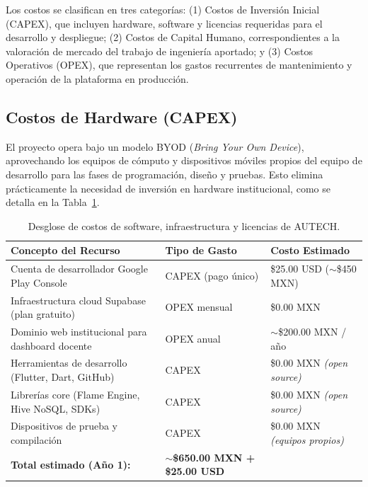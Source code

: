 Los costos se clasifican en tres categorías: (1) Costos de Inversión Inicial (CAPEX), que incluyen hardware, software y licencias requeridas para el desarrollo y despliegue; (2) Costos de Capital Humano, correspondientes a la valoración de mercado del trabajo de ingeniería aportado; y (3) Costos Operativos (OPEX), que representan los gastos recurrentes de mantenimiento y operación de la plataforma en producción.

\subsection{Costos de Hardware (CAPEX)}
\label{subsec:costos_hardware}

El proyecto opera bajo un modelo BYOD (\textit{Bring Your Own Device}), aprovechando los equipos de cómputo y dispositivos móviles propios del equipo de desarrollo para las fases de programación, diseño y pruebas. Esto elimina prácticamente la necesidad de inversión en hardware institucional, como se detalla en la Tabla~\ref{tab:costos_despliegue}.

\begin{table}[htbp]
\centering
\caption{Desglose de costos de software, infraestructura y licencias de AUTECH.}
\label{tab:costos_despliegue}
\setlength{\tabcolsep}{4pt}
\renewcommand{\arraystretch}{1.2}
\scriptsize
\begin{tabularx}{\textwidth}{@{} >{\raggedright\arraybackslash}X >{\raggedright\arraybackslash}p{3cm} >{\raggedleft\arraybackslash}p{4.2cm} @{}}
\toprule
\textbf{Concepto del Recurso} &
\textbf{Tipo de Gasto} &
\textbf{Costo Estimado} \\
\midrule

Cuenta de desarrollador Google Play Console
  & CAPEX (pago único)  & \$25.00 USD (${\sim}$\$450 MXN) \\

Infraestructura cloud Supabase (plan gratuito)
  & OPEX mensual        & \$0.00 MXN \\

Dominio web institucional para dashboard docente
  & OPEX anual          & ${\sim}$\$200.00 MXN / año \\

Herramientas de desarrollo (Flutter, Dart, GitHub)
  & CAPEX                & \$0.00 MXN \textit{(open source)} \\

Librerías core (Flame Engine, Hive NoSQL, SDKs)
  & CAPEX                & \$0.00 MXN \textit{(open source)} \\

Dispositivos de prueba y compilación
  & CAPEX                & \$0.00 MXN \textit{(equipos propios)} \\

\midrule
\multicolumn{2}{@{} >{\raggedright\arraybackslash}p{10cm}}%
  {\textbf{Total estimado (Año 1):}} &
  ${\sim}$\textbf{\$650.00 MXN + \$25.00 USD} \\

\bottomrule
\end{tabularx}
\end{table}

